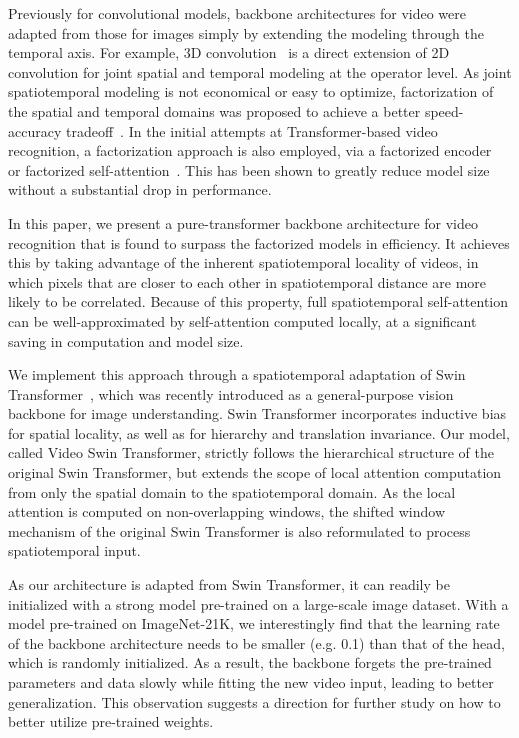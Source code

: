 \documentclass{article}
\begin{document}
Previously for convolutional models, backbone architectures for video were adapted from those for images simply by extending the modeling through the temporal axis. For example, 3D convolution~\cite{tran2015learning} is a direct extension of 2D convolution for joint spatial and temporal modeling at the operator level. As joint spatiotemporal modeling is not economical or easy to optimize, factorization of the spatial and temporal domains was proposed to achieve a better speed-accuracy tradeoff~\cite{qiu2017P3D,xie2018rethinking}. In the initial attempts at Transformer-based video recognition, a factorization approach is also employed, via a factorized encoder~\cite{arnab2021vivit} or factorized self-attention~\cite{arnab2021vivit, timesformer2021}. This has been shown to greatly reduce model size without a substantial drop in performance.

In this paper, we present a pure-transformer backbone architecture for video recognition that is found to surpass the factorized models in efficiency. It achieves this by taking advantage of the inherent spatiotemporal locality of videos, in which pixels that are closer to each other in spatiotemporal distance are more likely to be correlated. Because of this property, full spatiotemporal self-attention can be well-approximated by self-attention computed locally, at a significant saving in computation and model size. 

We implement this approach through a spatiotemporal adaptation of Swin Transformer~\cite{liu2021swin}, which was recently introduced as a general-purpose vision backbone for image understanding. Swin Transformer incorporates inductive bias for spatial locality, as well as for hierarchy and translation invariance. Our model, called Video Swin Transformer, strictly follows the hierarchical structure of the original Swin Transformer, but extends the scope of local attention computation from only the spatial domain to the spatiotemporal domain. As the local attention is computed on non-overlapping windows, the shifted window mechanism of the original Swin Transformer is also reformulated to process spatiotemporal input.

As our architecture is adapted from Swin Transformer, it can readily be initialized with a strong model pre-trained on a large-scale image dataset.
With a model pre-trained on ImageNet-21K, we interestingly find that the learning rate of the backbone architecture needs to be smaller (e.g. 0.1) than that of the head, which is randomly initialized. As a result, the backbone forgets the pre-trained parameters and data slowly while fitting the new video input, leading to better generalization. This observation suggests a direction for further study on how to better utilize pre-trained weights.
\end{document}

